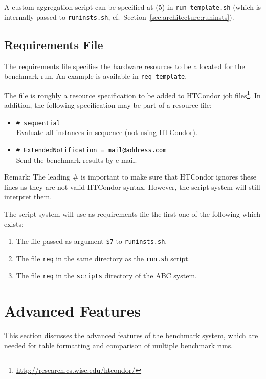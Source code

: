 \documentclass[a4paper]{article}
\newcommand{\abcs}{{ABC}}
\begin{document}
			A custom aggregation script can be specified at (5) in {\tt run\_template.sh} (which is internally passed to {\tt runinsts.sh}, cf.~Section~\ref{sec:architecture:runinsts}).
	
		\subsection{Requirements File}
		\label{sec:architecture:reqfile}
				
			The requirements file specifies the hardware resources to be allocated
			for the benchmark run.
			An example is available in {\tt req\_template}.
			
			The file is roughly a resource specification to be added to
			HTCondor job files\footnote{\url{http://research.cs.wisc.edu/htcondor/}}.
			In addition, the following specification may be part of a resource file:
			\begin{itemize}
				\item {\tt \# sequential} \\
					Evaluate all instances in sequence (not using HTCondor).
				\item {\tt \# ExtendedNotification = mail@address.com} \\
					 Send the benchmark results by e-mail. 
			\end{itemize}
			Remark: The leading {\#} is important to make sure that HTCondor ignores these lines
			as they are not valid HTCondor syntax. However, the script system will still interpret them.
	
			The script system will use as requirements file the first one of the following which exists:
			\begin{enumerate}
				\item The file passed as argument {\tt \$7} to {\tt runinsts.sh}.
				\item The file {\tt req} in the same directory as the {\tt run.sh} script.
				\item The file {\tt req} in the {\tt scripts} directory of the \abcs{} system.
			\end{enumerate}

	\section{Advanced Features}
	\label{sec:advanced}

		This section discusses the advanced features of the benchmark system,
		which are needed for table formatting and comparison of multiple benchmark runs.
\end{document}
